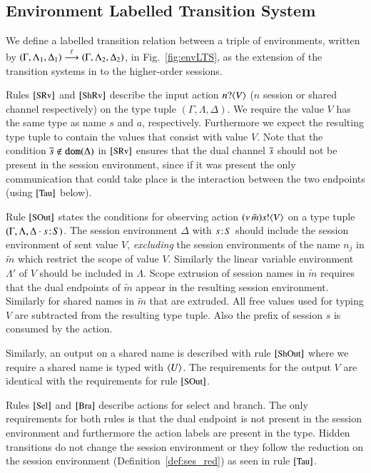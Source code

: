 \subsection{Environment Labelled Transition System}
\label{ss:elts}
\noi 
We define a labelled transition relation between 
a triple of environments, 
written by  
$(\Gamma, \Lambda_1, \Delta_1) \stackrel{\ell}{\longrightarrow} (\Gamma, \Lambda_2, \Delta_2)$, 
in Fig.~\ref{fig:envLTS}, 
as the extension of the transition systems
in \cite{DBLP:conf/forte/KouzapasYH11,KY13,dkphdthesis} 
to the higher-order sessions. 

Rules $\eltsrule{SRv}$ and $\eltsrule{ShRv}$ describe the input action
$n ? \langle V \rangle$ ($n$ session or shared channel respectively) on the
type tuple $(\Gamma, \Lambda, \Delta)$.  We require the value $V$ has
the same type as name $s$ and $a$, respectively.  Furthermore we
expect the resulting type tuple to contain the values that consist
with value $V$. Note that the condition $\overline{s} \notin \mathtt{dom}(\Delta)$
in $\eltsrule{SRv}$ ensures that 
the dual channel $\overline{s}$ should not be
present in the session environment, since if it was present
the only communication that could take place is the interaction
between the two endpoints (using $\eltsrule{Tau}$ below).

Rule $\eltsrule{SOut}$ states the conditions for observing action
$(\nu\, \tilde{m}) s ! \langle V \rangle$ on a type tuple 
$(\Gamma, \Lambda, \Delta\cdot s \! : \! S)$. 
The session environment $\Delta$ with $s \! : \! S$ 
should include the session environment of sent value $V$, 
{\em excluding} the session environments of the name $n_j$ 
in $\tilde{m}$ which restrict the scope of value $V$. 
Similarly the linear variable environment 
$\Lambda'$ of $V$ should be included in $\Lambda$. 
Scope extrusion of session names in $\tilde{m}$ requires
that the dual endpoints of $\tilde{m}$ appear in
the resulting session environment. Similarly for shared 
names in $\tilde{m}$ that are extruded.  
All free values used for typing $V$ are subtracted from the
resulting type tuple. Also the prefix of session $s$ is consumed
by the action.

Similarly, an output on a shared name is described
with rule $\eltsrule{ShOut}$ where we require a shared name
is typed with $\langle U \rangle$. The requirements for
the output $V$ are identical with the requirements for
rule $\eltsrule{SOut}$.

Rules $\eltsrule{Sel}$ and $\eltsrule{Bra}$ describe actions for
select and branch. The only requirements for both
rules is that the dual endpoint is not present in the session
environment and furthermore the action labels are present
in the type.
Hidden transitions do not change the session environment
or they follow the reduction on the session
environment (Definition~\ref{def:ses_red}) as seen in rule
$\eltsrule{Tau}$.

